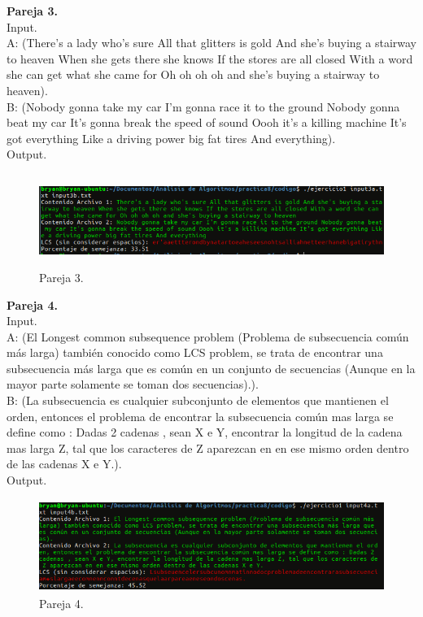 \documentclass[12pt]{report}
\begin{document}
	\textbf{Pareja 3.}\\
	Input.\\
	A: (There's a lady who's sure All that glitters is gold And she's buying a stairway to heaven When she gets there she knows If the stores are all closed With a word she can get what she came for Oh oh oh oh and she's buying a stairway to heaven).\\
	B: (Nobody gonna take my car I'm gonna race it to the ground Nobody gonna beat my car It's gonna break the speed of sound Oooh it's a killing machine It's got everything Like a driving power big fat tires And everything).\\	
	Output.\\	
	\begin{figure}[H]
		\includegraphics[height=3cm,width=15cm]{imagenes/5.png}
		\centering
		\caption{Pareja 3.}
		\centering
	\end{figure}
	
	\newpage
	
	\textbf{Pareja 4.}\\
	Input.\\
	A: (El Longest common subsequence problem (Problema de subsecuencia común más larga) también conocido como LCS problem, se trata de encontrar una subsecuencia más larga que es común en un conjunto de secuencias (Aunque en la mayor parte solamente se toman dos secuencias).).\\
	B: (La subsecuencia es cualquier subconjunto de elementos que mantienen el orden, entonces el problema de encontrar la subsecuencia común mas larga se define como : Dadas 2 cadenas , sean X e Y, encontrar la longitud de la cadena mas larga Z, tal que los caracteres de Z aparezcan en en ese mismo orden dentro de las cadenas X e Y.).\\	
	Output.\\	
	\begin{figure}[H]
		\includegraphics[height=3cm,width=15cm]{imagenes/6.png}
		\centering
		\caption{Pareja 4.}
		\centering
	\end{figure}
	
\end{document}
